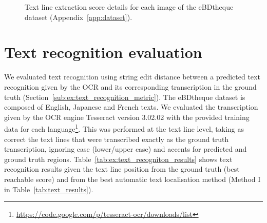 \begin{figure}[!ht]
  \caption[Text line extraction score details for each image of the eBDtheque dataset]{Text line extraction score details for each image of the eBDtheque dataset (Appendix~\ref{app:dataset}).}
    \label{fig:ex:text_detection_result_details}
\end{figure}

\section{Text recognition evaluation} %
\label{par:ex:text_recognition_evaluation}

We evaluated text recognition using string edit distance between a predicted text recognition given by the OCR and its corresponding transcription in the ground truth (Section~\ref{sub:ex:text_recognition_metric}).
The eBDtheque dataset is composed of English, Japanese and French texts.
We evaluated the transcription given by the OCR engine Tesseract version 3.02.02 with the provided training data for each language\footnote{\url{https://code.google.com/p/tesseract-ocr/downloads/list}}.
This was performed at the text line level, taking as correct the text lines that were transcribed exactly as the ground truth transcription, ignoring case (lower/upper case) and accents for predicted and ground truth regions.
Table~\ref{tab:ex:text_recogniton_results} shows text recognition results given the text line position from the ground truth (best reachable score) and from the best automatic text localisation method (Method I in Table~\ref{tab:text_results}).

